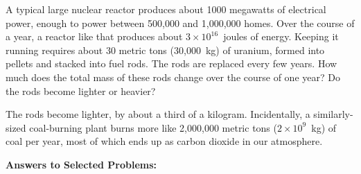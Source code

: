 \begin{Exercise}[difficulty=0]
A typical large nuclear reactor produces about 1000 megawatts of electrical power, enough to power between 500,000 and 1,000,000 homes.  Over the course of a year, a reactor like that produces about $3 \times 10^{16}$~joules of energy.  Keeping it running requires about 30 metric tons (30,000~kg) of uranium, formed into pellets and stacked into fuel rods.  The rods are replaced every few years.  How much does the total mass of these rods change over the course of one year?  Do the rods become lighter or heavier?
\end{Exercise}
\begin{Answer}
The rods become lighter, by about a third of a kilogram.  Incidentally, a similarly-sized coal-burning plant burns more like 2,000,000 metric tons ($2 \times 10^9$~kg) of coal per year, most of which ends up as carbon dioxide in our atmosphere.
\end{Answer}




\bigskip\bigskip\bigskip
\pagebreak[3]
\textbf{Answers to Selected {\thesubsection} Problems:}
\label{energy_mass_prob_answers}
\shipoutAnswer

\cleardoublepage